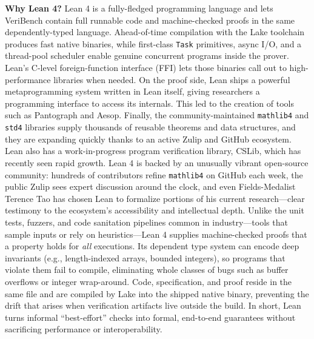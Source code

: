 \documentclass{article}
\begin{document}
\textbf{Why Lean 4?}
Lean 4 is a fully-fledged programming language and lets VeriBench contain full runnable code and machine-checked proofs in the same dependently-typed language.
Ahead-of-time compilation with the Lake toolchain produces fast native binaries, while first-class \texttt{Task} primitives, async I/O, and a thread-pool scheduler enable genuine concurrent programs inside the prover.
Lean’s C-level foreign-function interface (FFI) lets those binaries call out to high-performance libraries when needed.
On the proof side, Lean ships a powerful metaprogramming system written in Lean itself, giving researchers a programming interface to access its internals. This led to the creation of tools such as Pantograph and Aesop.
Finally, the community-maintained \texttt{mathlib4} and \texttt{std4} libraries supply thousands of reusable theorems and data structures, and they are expanding quickly thanks to an active Zulip and GitHub ecosystem. Lean also has a work-in-progress program verification library, CSLib, which has recently seen rapid growth.
Lean 4 is backed by an unusually vibrant open-source community: hundreds of contributors refine \texttt{mathlib4} on GitHub each week, the public Zulip sees expert discussion around the clock, and even Fields-Medalist Terence Tao has chosen Lean to formalize portions of his current research—clear testimony to the ecosystem’s accessibility and intellectual depth.
Unlike the unit tests, fuzzers, and code sanitation pipelines common in industry—tools that sample inputs or rely on heuristics—Lean 4 supplies machine-checked proofs that a property holds for \emph{all} executions.
Its dependent type system can encode deep invariants (e.g., length-indexed arrays, bounded integers), so programs that violate them fail to compile, eliminating whole classes of bugs such as buffer overflows or integer wrap-around.
Code, specification, and proof reside in the same file and are compiled by Lake into the shipped native binary, preventing the drift that arises when verification artifacts live outside the build.
In short, Lean turns informal “best-effort” checks into formal, end-to-end guarantees without sacrificing performance or interoperability.
\end{document}
